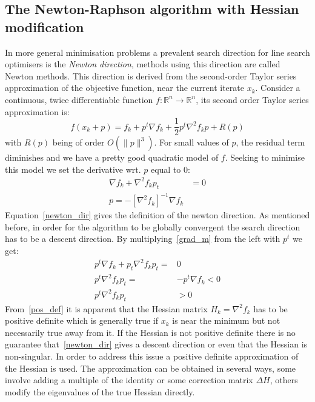 \documentclass{article}
\begin{document}
    \subsection{The Newton-Raphson algorithm with Hessian modification}
    \label{newtonalgo}
    In more general minimisation problems a prevalent search direction for line search optimisers is the \textit{Newton direction}, methods using this direction are called Newton methods.
    This direction is derived from the second-order Taylor series approximation of the objective function, near the current iterate $x_k$.
    Consider a continuous, twice differentiable function $f: \mathbb{R}^n \to \mathbb{R}^n$, its second order Taylor series approximation is:
    \begin{equation}
        f(x_k + p) = f_k + p^t \nabla f_k + \frac{1}{2} p^t \nabla^2 f_k p + R(p) \label{taylor}
    \end{equation}
    with $R(p)$ being of order $O(\rVert p \rVert^3)$.
    For small values of $p$, the residual term diminishes and we have a pretty good quadratic model of $f$.
    Seeking to minimise this model we set the derivative wrt. $p$ equal to 0:
    \begin{align}
        \nabla f_k + \nabla^2 f_k p_t &= 0  \label{grad_m} \\
        p = -\left[ \nabla^2 f_k \right]^{-1} \nabla f_k \label{newton_dir}
    \end{align}
    Equation~\eqref{newton_dir} gives the definition of the newton direction.
    As mentioned before, in order for the algorithm to be globally convergent the search direction has to be a descent direction.
    By multiplying~\eqref{grad_m} from the left with $p^t$ we get:
    \begin{align}
        p^t \nabla f_k + p_t \nabla^2 f_k p_t =& 0 \\
        p^t \nabla^2 f_k p_t =& -p^t \nabla f_k < 0 \\
        p^t \nabla^2 f_k p_t &> 0 \label{pos_def}
    \end{align}
    From~\eqref{pos_def} it is apparent that the Hessian matrix $H_k=\nabla^2 f_k$ has to be positive definite which is generally true if $x_k$ is near the minimum but not necessarily true away from it.
    If the Hessian is not positive definite there is no guarantee that~\eqref{newton_dir} gives a descent direction or even that the Hessian is non-singular.
    In order to address this issue a positive definite approximation of the Hessian is used.
    The approximation can be obtained in several ways, some involve adding a multiple of the identity or some correction matrix $\Delta H$, others modify the eigenvalues of the true Hessian directly.
\end{document}
